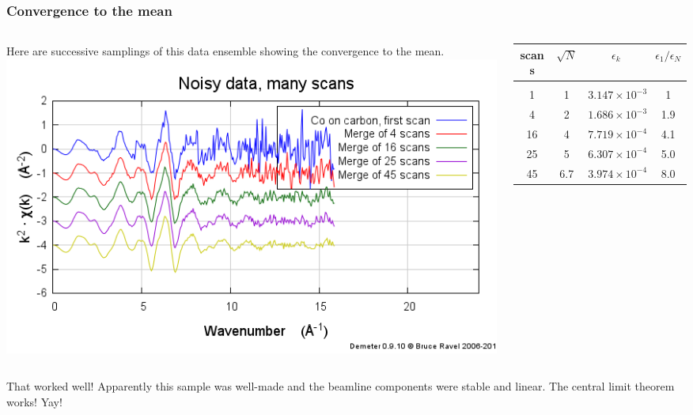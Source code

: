 \documentclass[10pt, xcolor=x11names, compress]{beamer}
\begin{document}
\begin{frame}
  \frametitle{Convergence to the mean}
  \begin{columns}
    \begin{column}{0.5\linewidth}
      Here are successive samplings of this data ensemble showing the
      convergence to the mean. \\
      \includegraphics[width=\linewidth]{images/CoGr.png}
    \end{column}
    \begin{column}{0.5\linewidth}
      \small
      \begin{tabular}[h]{cccc}
        scans & $\sqrt{N}$ & $\epsilon_k$ & $\epsilon_1/\epsilon_N$ \\
        \hline\\
        1   & 1   & $3.147\times 10^{-3}$ & 1 \\
        4   & 2   & $1.686\times 10^{-3}$ & 1.9 \\
        16  & 4   & $7.719\times 10^{-4}$ & 4.1 \\
        25  & 5   & $6.307\times 10^{-4}$ & 5.0 \\
        45  & 6.7 & $3.974\times 10^{-4}$ & 8.0
      \end{tabular}
    \end{column}
  \end{columns}
  \begin{exampleblock}{}
    That worked well!  Apparently this sample was well-made and the
    beamline components were stable and linear.  The central limit
    theorem works!  Yay!
  \end{exampleblock}
\end{frame}
\end{document}
